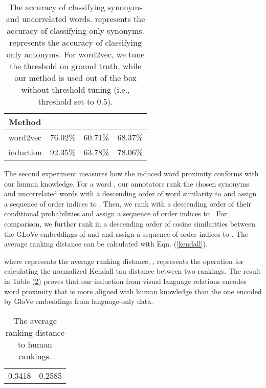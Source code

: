 \documentclass[10pt,twocolumn,letterpaper]{article}
\begin{document}
\begin{table}[t!]
\small
    \centering
    \caption{The accuracy of classifying synonyms and uncorrelated words.  represents the accuracy of classifying only synonyms.  represents the accuracy of classifying only antonyms. For word2vec, we tune the threshold on ground truth, while our method is used out of the box without threshold tuning (i.e., threshold set to 0.5).}
    \begin{tabular}{c|ccc}
        \toprule
         Method &  &  & \\
         \midrule
         word2vec  & 76.02\% & 60.71\% & 68.37\% \\
         induction & 92.35\% & 63.78\% & 78.06\% \\
         \bottomrule
    \end{tabular}
    \label{gqa_human_study_accuracy}
\end{table} 
The second experiment measures how the induced word proximity conforms with our human knowledge. For a word , our annotators rank the chosen synonyms and uncorrelated words  with a descending order of word similarity to  and assign a sequence of order indices  to . Then, we rank  with a descending order of their conditional probabilities and assign a sequence of order indices  to . For comparison, we further rank  in a descending order of cosine similarities between the GLoVe embeddings of  and  and assign a sequence of order indices  to . The average ranking distance can be calculated with Eqn. (\ref{kendall}). 

where  represents the average ranking distance, ,   represents the operation for calculating the normalized Kendall tau distance between two rankings. The result in Table (\ref{gqa_human_study_distance}) proves that our induction from visual language relations encodes word proximity that is more aligned with human knowledge than the one encoded by GloVe embeddings from language-only data. 

\begin{table}[t!]
\small
    \centering
    \caption{The average ranking distance to human rankings. }
    \begin{tabular}{cc}
        \toprule
          & \\
         \midrule
         0.3418 & 0.2585 \\
         \bottomrule
    \end{tabular}
    \label{gqa_human_study_distance}
    \vspace{-3mm}
\end{table} 
\end{document}
